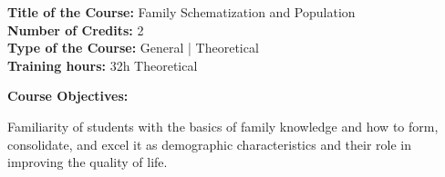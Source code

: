 \documentclass[12pt,a4paper]{article}
\begin{document}
\newpage
\nopagebreak
\textbf{Title of the Course:} Family Schematization and Population\\
\textbf{Number of Credits:} 2\\
\textbf{Type of the Course:} General | Theoretical\\
\textbf{Training hours:} 32h Theoretical\par\vspace{4pt}
\textbf{Course Objectives:}\par\vspace{2pt}
Familiarity of students with the basics of family knowledge and how to form, consolidate, and
excel it as demographic characteristics and their role in improving the quality of life.\par\vspace{4pt}
\end{document}
